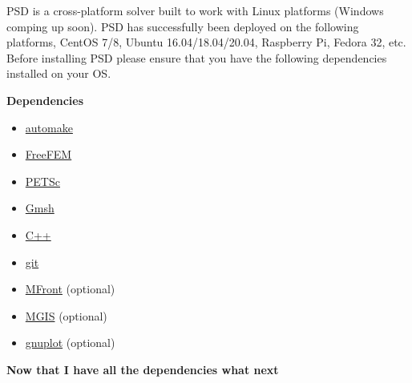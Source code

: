 PSD is a cross-platform solver built to work with Linux platforms
(Windows comping up soon). PSD has successfully been deployed on the
following platforms, CentOS 7/8, Ubuntu 16.04/18.04/20.04, Raspberry Pi,
Fedora 32, etc. Before installing PSD please ensure that you have the
following dependencies installed on your OS.

\textbf{Dependencies}

\begin{itemize}
\tightlist
\item
  \href{https://www.gnu.org/software/automake/}{automake}
\item
  \href{https://freefem.org/}{FreeFEM}
\item
  \href{https://www.mcs.anl.gov/petsc/}{PETSc}
\item
  \href{http://gmsh.info/}{Gmsh}
\item
  \href{http://www.cplusplus.com/}{C++}
\item
  \href{https://git-scm.com/}{git}
\item
  \href{http://tfel.sourceforge.net/}{MFront} (optional)
\item
  \href{https://thelfer.github.io/mgis/web/bindings-cxx.html}{MGIS}
  (optional)
\item
  \href{http://www.gnuplot.info/}{gnuplot} (optional)
\end{itemize}

\textbf{Now that I have all the dependencies what next}

